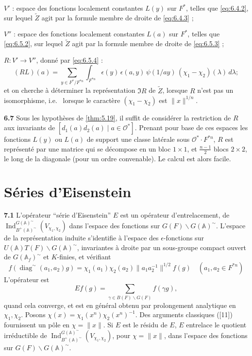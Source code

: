 \documentclass[12pt,a4paper]{article}
\theoremstyle{plain}
\theoremstyle{definition}
\theoremstyle{remark}
\DeclareMathOperator{\Ind}{Ind}
\DeclareMathOperator{\diag}{diag}
\newcommand{\Af}{\mathbb{A}}
\newcommand{\cO}{\mathcal{O}}
\newcommand{\wt}{\widetilde}
\providecommand{\cO}{\mathcal{O}}
\begin{document}
$V'$ : espace des fonctions localement constantes $L(y)$ sur $F^*$, telles que \eqref{eq:6.4.2}, sur lequel $\wt{Z}$ agit par la formule membre de droite de \eqref{eq:6.4.3} ;

$V''$ : espace des fonctions localement constantes $L(a)$ sur $F^*$, telles que \eqref{eq:6.5.2}, sur lequel $\wt{Z}$ agit par la formule membre de droite de \eqref{eq:6.5.3} ;

$R : V' \to V''$, donné par \eqref{eq:6.5.4} :
\[
(RL)(a) = \sum_{y \in F^*/F^{*n}} \int_{F^{*n}} \epsilon(y) \, \epsilon(a, y) \, \psi(1/ay) \, (\chi_1 - \chi_2)(\lambda) \, d\lambda;
\]
et on cherche à déterminer la représentation $\Im R$ de $\wt{Z}$, lorsque $R$ n'est pas un isomorphisme, i.e.
\ lorsque le caractère $(\chi_1 - \chi_2)$ est $\|x\|^{1/n}$.

\textbf{6.7} Sous les hypothèses de \ref{thm:5.19}, il suffit de considérer la restriction de $R$ aux invariants de $[d_1(a) d_2(a) \mid a \in \cO^*]$. Prenant pour base de ces espaces les fonctions $L(y)$ ou $L(a)$ de support une classe latérale sous $\cO^* \cdot F^{*n}$, $R$ est représenté par une matrice qui se décompose en un bloc $1 \times 1$, et $\frac{n-1}{2}$ blocs $2 \times 2$, le long de la diagonale (pour un ordre convenable). Le calcul est alors facile.

\section{Séries d'Eisenstein}

\textbf{7.1} L'opérateur ``série d'Eisenstein'' $E$ est un opérateur d'entrelacement, de $\Ind_{B^+(\Af)^\sim}^{G(\Af)^\sim}(V_{\chi_1, \chi_2})$ dans l'espace des fonctions sur $G(F) \backslash G(\Af)^\sim$. L'espace de la représentation induite s'identifie à l'espace des $\epsilon$-fonctions sur $U(\Af) T(F) \backslash G(\Af)^\sim$, invariantes à droite par un sous-groupe compact ouvert de $G(\Af_f)^\sim$ et $K$-finies, et vérifiant
\[
f(\diag^\sim(a_1, a_2) g) = \chi_1(a_1) \chi_2(a_2) \|a_1 a_2^{-1}\|^{1/2} f(g) \quad (a_1, a_2 \in F^{*n})
\]
L'opérateur est
\[
Ef(g) = \sum_{\gamma \in B(F) \backslash G(F)} f(\gamma g),
\]
quand cela converge, et est en général obtenu par prolongement analytique en $\chi_1, \chi_2$. Posons $\chi(x) = \chi_1(x^n) \chi_2(x^n)^{-1}$. Des arguments classiques ([11]) fournissent un pôle en $\chi = \|x\|$. Si $E$ est le résidu de $E$, $E$ entrelace le quotient irréductible de $\Ind_{B^+(\Af)^\sim}^{G(\Af)^\sim}(V_{\chi_1, \chi_2})$, pour $\chi = \|x\|$, dans l'espace des fonctions sur $G(F) \backslash G(\Af)^\sim$.
\end{document}
